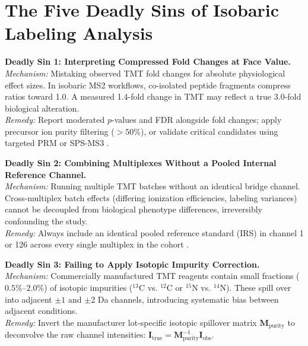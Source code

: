 \documentclass[11pt,oneside]{book}
\begin{document}
\section{The Five Deadly Sins of Isobaric Labeling Analysis}

\begin{pitfallbox}
\textbf{Deadly Sin 1: Interpreting Compressed Fold Changes at Face Value.}\\
\textit{Mechanism:} Mistaking observed TMT fold changes for absolute physiological effect sizes. In isobaric MS2 workflows, co-isolated peptide fragments compress ratios toward 1.0. A measured 1.4-fold change in TMT may reflect a true 3.0-fold biological alteration.\\
\textit{Remedy:} Report moderated $p$-values and FDR alongside fold changes; apply precursor ion purity filtering ($>50\%$), or validate critical candidates using targeted PRM or SPS-MS3 \cite{ting2011sps}.
\end{pitfallbox}

\begin{pitfallbox}
\textbf{Deadly Sin 2: Combining Multiplexes Without a Pooled Internal Reference Channel.}\\
\textit{Mechanism:} Running multiple TMT batches without an identical bridge channel. Cross-multiplex batch effects (differing ionization efficiencies, labeling variances) cannot be decoupled from biological phenotype differences, irreversibly confounding the study.\\
\textit{Remedy:} Always include an identical pooled reference standard (IRS) in channel 1 or 126 across every single multiplex in the cohort \cite{plubell2017extended}.
\end{pitfallbox}

\begin{pitfallbox}
\textbf{Deadly Sin 3: Failing to Apply Isotopic Impurity Correction.}\\
\textit{Mechanism:} Commercially manufactured TMT reagents contain small fractions ($0.5\%$--$2.0\%$) of isotopic impurities ($^{13}\text{C}$ vs. $^{12}\text{C}$ or $^{15}\text{N}$ vs. $^{14}\text{N}$). These spill over into adjacent $\pm 1$ and $\pm 2$ Da channels, introducing systematic bias between adjacent conditions.\\
\textit{Remedy:} Invert the manufacturer lot-specific isotopic spillover matrix $\mathbf{M}_{\text{purity}}$ to deconvolve the raw channel intensities: $\mathbf{I}_{\text{true}} = \mathbf{M}_{\text{purity}}^{-1} \mathbf{I}_{\text{obs}}$.
\end{pitfallbox}
\end{document}
